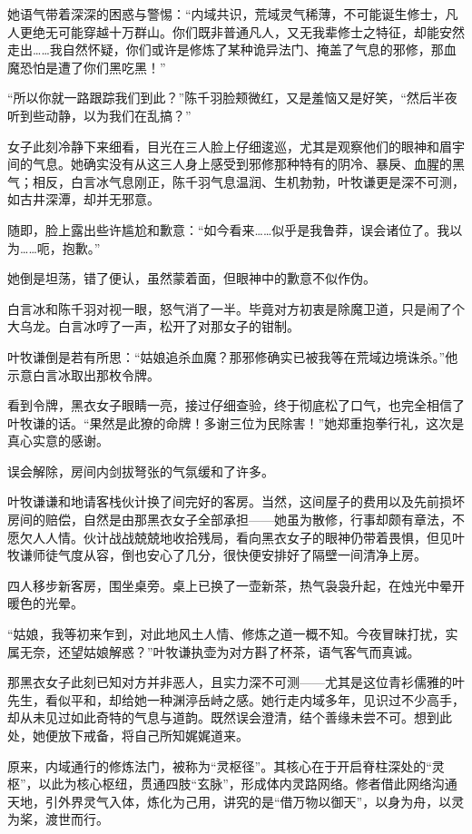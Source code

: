 她语气带着深深的困惑与警惕：“内域共识，荒域灵气稀薄，不可能诞生修士，凡人更绝无可能穿越十万群山。你们既非普通凡人，又无我辈修士之特征，却能安然走出……我自然怀疑，你们或许是修炼了某种诡异法门、掩盖了气息的邪修，那血魔恐怕是遭了你们黑吃黑！”

“所以你就一路跟踪我们到此？”陈千羽脸颊微红，又是羞恼又是好笑，“然后半夜听到些动静，以为我们在乱搞？”

女子此刻冷静下来细看，目光在三人脸上仔细逡巡，尤其是观察他们的眼神和眉宇间的气息。她确实没有从这三人身上感受到邪修那种特有的阴冷、暴戾、血腥的黑气；相反，白言冰气息刚正，陈千羽气息温润、生机勃勃，叶牧谦更是深不可测，如古井深潭，却并无邪意。

随即，脸上露出些许尴尬和歉意：“如今看来……似乎是我鲁莽，误会诸位了。我以为……呃，抱歉。”

她倒是坦荡，错了便认，虽然蒙着面，但眼神中的歉意不似作伪。

白言冰和陈千羽对视一眼，怒气消了一半。毕竟对方初衷是除魔卫道，只是闹了个大乌龙。白言冰哼了一声，松开了对那女子的钳制。

叶牧谦倒是若有所思：“姑娘追杀血魔？那邪修确实已被我等在荒域边境诛杀。”他示意白言冰取出那枚令牌。

看到令牌，黑衣女子眼睛一亮，接过仔细查验，终于彻底松了口气，也完全相信了叶牧谦的话。“果然是此獠的命牌！多谢三位为民除害！”她郑重抱拳行礼，这次是真心实意的感谢。

误会解除，房间内剑拔弩张的气氛缓和了许多。

叶牧谦谦和地请客栈伙计换了间完好的客房。当然，这间屋子的费用以及先前损坏房间的赔偿，自然是由那黑衣女子全部承担——她虽为散修，行事却颇有章法，不愿欠人人情。伙计战战兢兢地收拾残局，看向黑衣女子的眼神仍带着畏惧，但见叶牧谦师徒气度从容，倒也安心了几分，很快便安排好了隔壁一间清净上房。

四人移步新客房，围坐桌旁。桌上已换了一壶新茶，热气袅袅升起，在烛光中晕开暖色的光晕。

“姑娘，我等初来乍到，对此地风土人情、修炼之道一概不知。今夜冒昧打扰，实属无奈，还望姑娘解惑？”叶牧谦执壶为对方斟了杯茶，语气客气而真诚。

那黑衣女子此刻已知对方并非恶人，且实力深不可测——尤其是这位青衫儒雅的叶先生，看似平和，却给她一种渊渟岳峙之感。她行走内域多年，见识过不少高手，却从未见过如此奇特的气息与道韵。既然误会澄清，结个善缘未尝不可。想到此处，她便放下戒备，将自己所知娓娓道来。

原来，内域通行的修炼法门，被称为“灵枢径”。其核心在于开启脊柱深处的“灵枢”，以此为核心枢纽，贯通四肢“玄脉”，形成体内灵路网络。修者借此网络沟通天地，引外界灵气入体，炼化为己用，讲究的是“借万物以御天”，以身为舟，以灵为桨，渡世而行。

